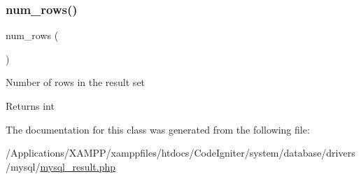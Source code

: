 \subsubsection{\texorpdfstring{num\+\_\+rows()}{num\_rows()}}
{\footnotesize\ttfamily num\+\_\+rows (\begin{DoxyParamCaption}{ }\end{DoxyParamCaption})}

Number of rows in the result set

\begin{DoxyReturn}{Returns}
int 
\end{DoxyReturn}


The documentation for this class was generated from the following file\+:\begin{DoxyCompactItemize}
\item 
/\+Applications/\+X\+A\+M\+P\+P/xamppfiles/htdocs/\+Code\+Igniter/system/database/drivers/mysql/\mbox{\hyperlink{mysql__result_8php}{mysql\+\_\+result.\+php}}\end{DoxyCompactItemize}

